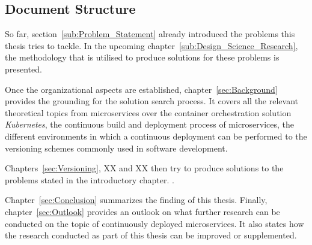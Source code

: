 
\subsection{Document Structure}%
\label{sub:Document Structure}

So far, section~\ref{sub:Problem_Statement} already introduced the problems
this thesis tries to tackle. In the upcoming
chapter~\ref{sub:Design_Science_Research}, the methodology that is utilised to
produce solutions for these problems is presented.

Once the organizational aspects are established, chapter~\ref{sec:Background}
provides the grounding for the solution search process. It covers all the
relevant theoretical topics from microservices over the container orchestration
solution \textit{Kubernetes}, the continuous build and deployment process of
microservices, the different environments in which a continuous deployment can
be performed to the versioning schemes commonly used in software development.

 Chapters~\ref{sec:Versioning}, XX and XX then
try to produce solutions to the problems stated in the introductory chapter.
.

Chapter~\ref{sec:Conclusion} summarizes the finding of this thesis. Finally,
chapter~\ref{sec:Outlook} provides an outlook on what further research can be
conducted on the topic of continuously deployed microservices. It also states
how the research conducted as part of this thesis can be improved or
supplemented.
